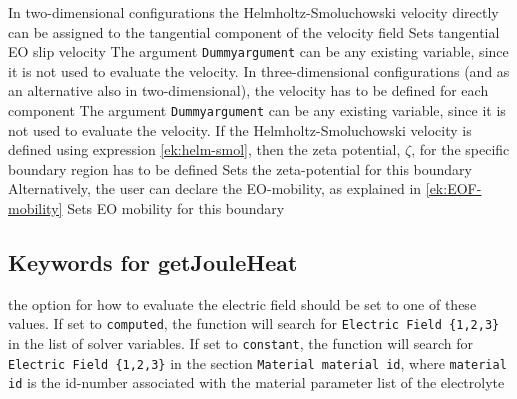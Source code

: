    \newline
  In two-dimensional configurations the Helmholtz-Smoluchowski velocity directly can be assigned to the tangential component of the velocity field
  \sifbegin
          Sets tangential EO slip velocity
  \sifend
  The argument \texttt{Dummyargument} can be any existing variable, since it is not used to evaluate the velocity.\newline
  In three-dimensional configurations (and as an alternative also in two-dimensional), the velocity has to be defined for each component
  \sifbegin
  \sifend
  The argument \texttt{Dummyargument} can be any existing variable, since it is not used to evaluate the velocity.\newline
  If the Helmholtz-Smoluchowski velocity is defined using expression \eqref{ek:helm-smol}, then the zeta potential, $\zeta$, for the specific boundary region has to be defined
  \sifbegin
    Sets the zeta-potential for this boundary
  \sifend
  Alternatively, the user can declare the EO-mobility, as explained in \eqref{ek:EOF-mobility}
    \sifbegin
        Sets EO mobility for this boundary
  \sifend
\sifend
\subsection*{Keywords for getJouleHeat}
\sifbegin
  \sifbegin
    the option for how to evaluate the electric field should be set to one of these values.\newline
    If set to  \texttt{computed}, the function will search for \texttt{Electric Field \{1,2,3\}} in the list of solver variables. If set to \texttt{constant}, the function will search for \texttt{Electric Field \{1,2,3\}} in the section \texttt{Material material id}, where \texttt{material id} is the id-number associated with the material parameter list of the electrolyte
  \sifend

